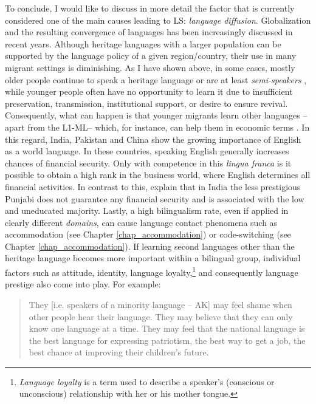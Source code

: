 \documentclass[output=paper]{langscibook}
\begin{document}
\largerpage
To conclude, I would like to discuss in more detail the factor that is currently considered one of the main causes leading to LS: \emph{language diffusion}. Globalization and the resulting convergence of languages has been increasingly discussed in recent years. Although heritage languages with a larger population can be supported by the language policy of a given region/country, their use in many migrant settings is diminishing. As I have shown above, in some cases, mostly older people continue to speak a heritage language or are at least \emph{semi-speakers} \parencite{Dorian1980}, while younger people often have no opportunity to learn it due to insufficient preservation, transmission, institutional support, or desire to ensure revival. Consequently, what can happen is that younger migrants learn other languages -- apart from the L1-ML-- which, for instance, can help them in economic terms \parencite{Holmes2013}. In this regard, India, Pakistan and China show the growing importance of English as a world language. In these countries, speaking English generally increases chances of financial security. Only with competence in this \emph{lingua franca} is it possible to obtain a high rank in the business world, where English determines all financial activities. In contrast to this, \textcite[74]{Nawaz2012} explain that in India the less prestigious Punjabi does not guarantee any financial security and is
associated with the low and uneducated majority. Lastly, a high bilingualism rate, even if applied in clearly different \emph{domains}, can cause language contact phenomena such as accommodation (see Chapter \ref{chap_accommodation}) or code-switching (see Chapter \ref{chap_accommodation}).
If learning second languages other than the heritage language becomes more important within a bilingual group, individual factors such as attitude, identity, language loyalty,\footnote{\emph{Language loyalty} is a term used to describe a speaker's (conscious or unconscious) relationship with her or his mother tongue.} and consequently language prestige also come into play. For example:

\begin{quote}
They [i.e. speakers of a minority language -- AK] may feel shame when other people hear their language. They may believe that they can only know one language at a time. They may feel that the national language is the best language for expressing patriotism, the best way to get a job, the best chance at improving their children's future. \parencite{SIL}
\end{quote}
\end{document}
